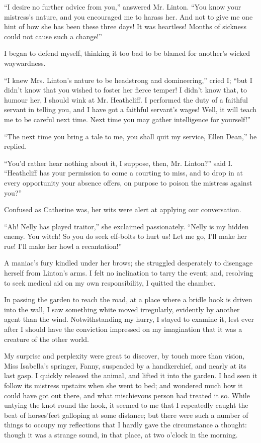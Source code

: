 \par “I desire no further advice from you,” answered Mr. Linton. “You know your mistress's nature, and you encouraged me to harass her. And not to give me one hint of how she has been these three days! It was heartless! Months of sickness could not cause such a change!”
\par I began to defend myself, thinking it too bad to be blamed for another's wicked waywardness.
\par “I knew Mrs. Linton's nature to be headstrong and domineering,” cried I; “but I didn't know that you wished to foster her fierce temper! I didn't know that, to humour her, I should wink at Mr. Heathcliff. I performed the duty of a faithful servant in telling you, and I have got a faithful servant's wages! Well, it will teach me to be careful next time. Next time you may gather intelligence for yourself!”
\par “The next time you bring a tale to me, you shall quit my service, Ellen Dean,” he replied.
\par “You'd rather hear nothing about it, I suppose, then, Mr. Linton?” said I. “Heathcliff has your permission to come a courting to miss, and to drop in at every opportunity your absence offers, on purpose to poison the mistress against you?”
\par Confused as Catherine was, her wits were alert at applying our conversation.
\par “Ah! Nelly has played traitor,” she exclaimed passionately. “Nelly is my hidden enemy. You witch! So you do seek elf-bolts to hurt us! Let me go, I'll make her rue! I'll make her howl a recantation!”
\par A maniac's fury kindled under her brows; she struggled desperately to disengage herself from Linton's arms. I felt no inclination to tarry the event; and, resolving to seek medical aid on my own responsibility, I quitted the chamber.
\par In passing the garden to reach the road, at a place where a bridle hook is driven into the wall, I saw something white moved irregularly, evidently by another agent than the wind. Notwithstanding my hurry, I stayed to examine it, lest ever after I should have the conviction impressed on my imagination that it was a creature of the other world.
\par My surprise and perplexity were great to discover, by touch more than vision, Miss Isabella's springer, Fanny, suspended by a handkerchief, and nearly at its last gasp. I quickly released the animal, and lifted it into the garden. I had seen it follow its mistress upstairs when she went to bed; and wondered much how it could have got out there, and what mischievous person had treated it so. While untying the knot round the hook, it seemed to me that I repeatedly caught the beat of horses'feet galloping at some distance; but there were such a number of things to occupy my reflections that I hardly gave the circumstance a thought: though it was a strange sound, in that place, at two o'clock in the morning.
